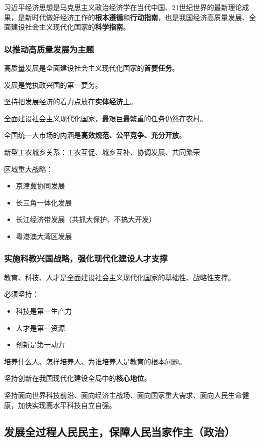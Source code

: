 \documentclass[12pt, a4paper, oneside]{ctexart}
\begin{document}
习近平经济思想是马克思主义政治经济学在当代中国、21世纪世界的最新理论成果，是新时代做好经济工作的\textbf{根本遵循}和\textbf{行动指南}，也是我国经济高质量发展、全面建设社会主义现代化国家的\textbf{科学指南}。

\subsubsection{以推动高质量发展为主题}

高质量发展是全面建设社会主义现代化国家的\textbf{首要任务}。

发展是党执政兴国的第一要务。

坚持把发展经济的着力点放在\textbf{实体经济}上。

全面建设社会主义现代化国家，最艰巨最繁重的任务仍然在农村。

全国统一大市场的内涵是\textbf{高效规范、公平竞争、充分开放}。

新型工农城乡关系：工农互促、城乡互补、协调发展、共同繁荣

区域重大战略：
\begin{itemize}
  \item 京津冀协同发展
  \item 长三角一体化发展
  \item 长江经济带发展（共抓大保护、不搞大开发）
  \item 粤港澳大湾区发展
\end{itemize}

\subsubsection{实施科教兴国战略，强化现代化建设人才支撑}

教育、科技、人才是全面建设社会主义现代化国家的基础性、战略性支撑。

必须坚持：
\begin{itemize}
  \item 科技是第一生产力
  \item 人才是第一资源
  \item 创新是第一动力
\end{itemize}

培养什么人、怎样培养人、为谁培养人是教育的根本问题。

坚持创新在我国现代化建设全局中的\textbf{核心地位}。

坚持面向世界科技前沿、面向经济主战场、面向国家重大需求、面向人民生命健康，加快实现高水平科技自立自强。

\subsection{发展全过程人民民主，保障人民当家作主（政治）}
\end{document}
